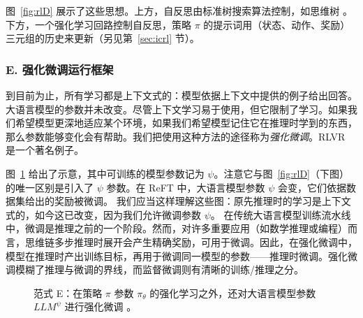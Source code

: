 
图~\ref{fig:rlD} 展示了这些思想。上方，自反思由标准树搜索算法控制，如思维树 \citep{yao2024tree}。下方，一个强化学习回路控制自反思，策略 $\pi$ 的提示词用（状态、动作、奖励）三元组的历史来更新（另见第~\ref{sec:icrl} 节）。
 



\subsubsection{E. 强化微调运行框架}
到目前为止，所有学习都是上下文式的：模型依据上下文中提供的例子给出回答。大语言模型的参数并未改变。尽管上下文学习易于使用，但它限制了学习。如果我们希望模型更深地适应某个环境，如果我们希望模型记住它在推理时学到的东西，那么参数能够变化会有帮助。我们把使用这种方法的途径称为{\em 强化微调}。RLVR 是一个著名例子。%

图~\ref{fig:rlE} 给出了示意，其中可训练的模型参数记为 $\psi$。注意它与图~\ref{fig:rlD}（下图）的唯一区别是引入了 $\psi$ 参数。在 ReFT 中，大语言模型参数 $\psi$ 会变，它们依据数据集给出的奖励被微调。%
我们应当这样理解这些图：原先推理时的学习是上下文式的，如今这已改变，因为我们允许微调参数 $\psi$。
%
在传统大语言模型训练流水线中，微调是推理之前的一个阶段。然而，对许多重要应用（如数学推理或编程）而言，思维链多步推理时展开会产生精确奖励，可用于微调。因此，在强化微调中，模型在推理时产出训练目标，再用于微调同一模型的参数——推理时微调。强化微调模糊了推理与微调的界线，而监督微调则有清晰的训练/推理之分。



\begin{figure}
  \begin{center}
    
    \caption{范式 E：在策略 $\pi$ 参数 $\pi_\theta$ 的强化学习之外，还对大语言模型参数
      $LLM^\psi$ 进行强化微调
      \citep{luong2024reft}。}\label{fig:rlE} 
  \end{center}
\end{figure}

